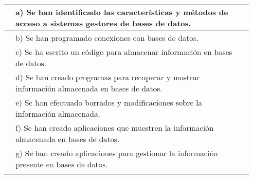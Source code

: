 \begin{longtable}{|>{\raggedright\arraybackslash}p{3.5cm}|p{10cm}|>{\centering\arraybackslash}p{1.2cm}|}
		& \label{RA9:CEa}a) Se han identificado las características y métodos de acceso a sistemas gestores de bases de datos. 
		&
		 \\
		 \cline{2-3}
		& \label{RA9:CEb}b) Se han programado conexiones con bases de datos. 
		&
		 \\
		 \cline{2-3}
		& \label{RA9:CEc}c) Se ha escrito un código para almacenar información en bases de datos. 
		&
		 \\
		 \cline{2-3}
		& \label{RA9:CEd}d) Se han creado programas para recuperar y mostrar información almacenada en bases de datos. 
		&
		 \\
		 \cline{2-3}
		& \label{RA9:CEe}e) Se han efectuado borrados y modificaciones sobre la información almacenada. 
		&
		 \\
		 \cline{2-3}
		& \label{RA9:CEf}f) Se han creado aplicaciones que muestren la información almacenada en bases de datos. 
		&
		 \\
		 \cline{2-3}
		& \label{RA9:CEg}g) Se han creado aplicaciones para gestionar la información presente en bases de datos. 
		&
		 \\
		 \cline{2-3}
\end{longtable}
\newpage